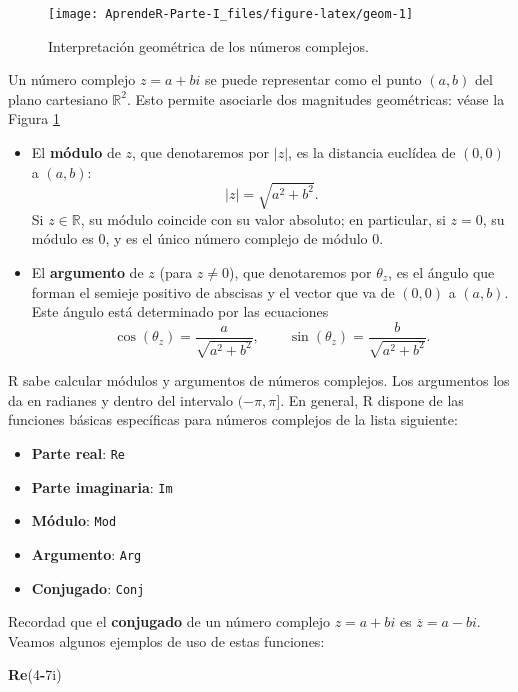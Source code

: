 \documentclass[]{book}
\newenvironment{Shaded}{\begin{snugshade}}{\end{snugshade}}
\newcommand{\DecValTok}[1]{\textcolor[rgb]{0.00,0.00,0.81}{#1}}
\newcommand{\KeywordTok}[1]{\textcolor[rgb]{0.13,0.29,0.53}{\textbf{#1}}}
\newcommand{\NormalTok}[1]{#1}
\newcommand{\OperatorTok}[1]{\textcolor[rgb]{0.81,0.36,0.00}{\textbf{#1}}}
\providecommand{\tightlist}{%
  \setlength{\itemsep}{0pt}\setlength{\parskip}{0pt}}
\theoremstyle{definition}
\theoremstyle{definition}
\theoremstyle{definition}
\theoremstyle{remark}
\begin{document}
\begin{figure}

{\centering \texttt{[image: AprendeR-Parte-I\_files/figure-latex/geom-1]} 

}

\caption{Interpretación geométrica de los números complejos.}\label{fig:geom}
\end{figure}

Un número complejo \(z=a+bi\) se puede representar como el punto \((a,b)\) del plano cartesiano \(\mathbb{R}^2\). Esto permite asociarle dos
magnitudes geométricas: véase la Figura \ref{fig:geom}

\begin{itemize}
\item
  El \textbf{módulo} de \(z\), que denotaremos por \(|z|\), es la distancia
  euclídea de \((0,0)\) a \((a,b)\):
  \[
  |z|=\sqrt{a^2+b^2}.
  \]
  Si \(z\in \mathbb{R}\), su módulo coincide con su valor absoluto; en particular, si \(z=0\), su módulo es \(0\), y es el único número complejo de módulo 0.
\item
  El \textbf{argumento} de \(z\) (para \(z\neq 0\)), que denotaremos por
  \(\theta_{z}\), es el ángulo que forman el semieje positivo de abscisas y el vector que va de \((0,0)\) a \((a,b)\).
  Este ángulo está determinado por las ecuaciones
  \[
  \cos (\theta_{z})=\frac{a}{\sqrt{a^2+b^2}},\qquad
  \sin (\theta_{z})=\frac{b}{\sqrt{a^2+b^2}}.
  \]
\end{itemize}

R sabe calcular módulos y argumentos de números complejos. Los argumentos los da en radianes y dentro del intervalo \((-\pi,\pi]\).
En general, R dispone de las funciones básicas específicas para números complejos de la lista siguiente:

\begin{itemize}
\tightlist
\item
  \textbf{Parte real}: \texttt{Re}
\item
  \textbf{Parte imaginaria}: \texttt{Im}
\item
  \textbf{Módulo}: \texttt{Mod}
\item
  \textbf{Argumento}: \texttt{Arg}
\item
  \textbf{Conjugado}: \texttt{Conj}
\end{itemize}

Recordad que el \textbf{conjugado} de un número complejo \(z=a+bi\) es \(\overline{z}=a-bi\). Veamos algunos ejemplos de uso de estas funciones:

\begin{Shaded}
\begin{Highlighting}[]
\KeywordTok{Re}\NormalTok{(}\DecValTok{4}\OperatorTok{-}\NormalTok{7i)}
\end{Highlighting}
\end{Shaded}
\end{document}
